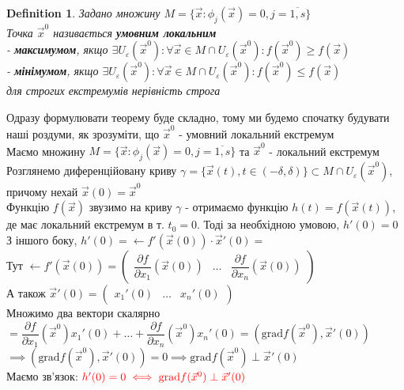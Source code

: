 \documentclass[a4paper, 14pt]{extarticle}
\def\bigline{\vspace{5mm}\\}
\theoremstyle{theoremdd}
\theoremstyle{theoremdd}
\newtheorem{definition}[theorem]{Definition}
\theoremstyle{theoremdd}
\theoremstyle{theoremdd}
\theoremstyle{theoremdd}
\theoremstyle{theoremdd}
\theoremstyle{theoremdd}
\theoremstyle{theoremdd}
\def\departial#1#2{\dfrac{\partial {#1}}{\partial {#2}}}
\begin{document}
\begin{definition}
Задано множину $M=\{ \vec{x}: \phi_j(\vec{x}) = 0, j=\overline{1,s} \}$\\
Точка $\vec{x}^0$ називається \textbf{умовним локальним}\\
- \textbf{максимумом}, якщо $\exists U_{\varepsilon}(\vec{x}^0): \forall \vec{x} \in M \cap U_{\varepsilon}(\vec{x}^0): f(\vec{x}^0) \geq f(\vec{x})$ \\
- \textbf{мінімумом}, якщо $\exists U_{\varepsilon}(\vec{x}^0): \forall \vec{x} \in M \cap U_{\varepsilon}(\vec{x}^0): f(\vec{x}^0) \leq f(\vec{x})$\\
для строгих екстремумів нерівність строга
\end{definition}

Одразу формулювати теорему буде складно, тому ми будемо спочатку будувати наші роздуми, як зрозуміти, що $\vec{x}^0$ - умовний локальний екстремум
\bigline
Маємо множину $M=\{\vec{x}: \phi_j(\vec{x}) = 0, j=\overline{1,s} \}$ та $\vec{x}^0$ - локальний екстремум\\
Розглянемо диференційовану криву $\gamma = \{\vec{x}(t), t \in (-\delta, \delta )\} \subset M \cap U_{\varepsilon}(\vec{x}^0)$, причому нехай $\vec{x}(0) = \vec{x}^0$\\
Функцію $f(\vec{x})$ звузимо на криву $\gamma$ - отримаємо функцію $h(t) = f(\vec{x}(t))$, де має локальний екстремум в т. $t_0 = 0$. Тоді за необхідною умовою, $h'(0) = 0$\\
З іншого боку, $h'(0) = \leftarrow{f'}(\vec{x}(0)) \cdot \vec{x}'(0) \boxed{=}$\\
Тут $\leftarrow{f'}(\vec{x}(0)) = \begin{pmatrix}
\departial{f}{x_1}(\vec{x}(0)) & \dots & \departial{f}{x_n}(\vec{x}(0))
\end{pmatrix}$\\
А також $\vec{x}'(0) = \begin{pmatrix}
x_1'(0) & \dots & x_n'(0)
\end{pmatrix}$\\
Множимо два вектори скалярно\\
$\boxed{=} \departial{f}{x_1}(\vec{x}^0) x_1'(0) + \dots + \departial{f}{x_n}(\vec{x}^0) x_n'(0) = (\textrm{grad} f(\vec{x}^0), \vec{x}'(0))$\\
$\implies (\textrm{grad} f(\vec{x}^0), \vec{x}'(0)) = 0 \implies \textrm{grad} f(\vec{x}^0) \perp \vec{x}'(0)$\\
Маємо зв'язок: $\textcolor{red}{h'(0) = 0 \iff \textrm{grad} f(\vec{x}^0) \perp \vec{x}'(0)}$
\end{document}
